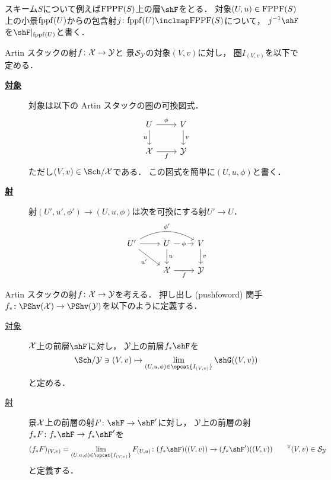     スキーム$S$について例えば$\mathrm{FPPF}(S)$上の層$\shF$をとる．
    対象$(U,u) \in \mathrm{FPPF}(S)$上の小景$\mathrm{fppf}(U)$からの包含射$j \colon \fppf(U) \inclmap \FPPF(S)$について，
    $j^{-1}\shF$を$\shF|_{\fppf(U)}$と書く．

    \begin{Def}[添字圏$I_{(V,v)}$]
        Artin スタックの射$f \colon \mathcal{X} \to \mathcal{Y}$と
        景$\mathcal{S}_{\mathcal{Y}}$の対象$(V,v)$に対し，
        圏$I_{(V,v)}$を以下で定める．
        \begin{description}
            \item[\underline{\textbf{対象}}]
            対象は以下の Artin スタックの圏の可換図式．
            \[
            \begin{tikzcd}
                U \ar[r, "\phi"]\ar[d, "u"']& V \ar[d, "v"]\\
                \stX \ar[r, "f"']& \stY
            \end{tikzcd}
            \]
            ただし$(V,v) \in \Sch/\stX$である．
            この図式を簡単に$(U,u,\phi)$と書く．

        \item[\underline{\textbf{射}}]
            射$(U',u',\phi') \to (U,u,\phi)$は次を可換にする射$U' \to U$．
            \[
            \begin{tikzcd}
                U' \ar[r]\ar[rr, bend left, "\phi'", ]\ar[rd, "u'"']& 
                U \ar[r, "\phi" description, crossing over]\ar[d, "u"]& V \ar[d, "v"]\\
                {} & \stX \ar[r, "f"']& \stY
            \end{tikzcd}
            \]
        \end{description}
    \end{Def}

    \begin{Def}
        Artin スタックの射$f \colon \mathcal{X} \to \mathcal{Y}$を考える．
        押し出し (pushfoword) 関手$f_* \colon \PShv(\stX) \to \PShv(\stY)$を以下のように定義する．
        \begin{description}
        \item[\underline{対象}] 
            $\mathcal{X}$上の前層$\shF$に対し，
            $\mathcal{Y}$上の前層$f_*\shF$を
            \[ \Sch/\stY \ni (V,v) \mapsto \lim_{(U,u,\phi) \in \opcat{I_{(V,v)}}} \shG((V,v)) \]
            と定める．

        \item[\underline{射}]
            景$\mathcal{X}$上の前層の射$F \colon \shF \to \shF'$に対し，
            $\mathcal{Y}$上の前層の射$f_*F \colon f_*\shF \to f_*\shF'$を
            \[
                (f_*F)_{(V,v)}=\lim_{(U,u,\phi) \in \opcat{I_{(V,v)}}} F_{(U,u)}
                    \colon (f_*\shF)((V,v)) \to (f_*\shF')((V,v))
                \qquad {}^{\forall} (V,v) \in \siteS_{\stY}
            \]
            と定義する．
        \end{description}
    \end{Def}

